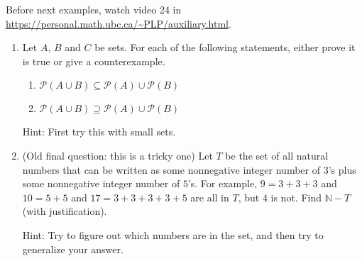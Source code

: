\documentclass[12pt]{article}
\newcommand{\set}[1]{\left\{ #1 \right\}}
\newcommand{\soln}[1]{
\iftoggle{show}{
{\color{red} \textbf{Solution:}#1
}}{}
}
\begin{document}
Before next examples, watch video 24 in \url{https://personal.math.ubc.ca/~PLP/auxiliary.html}.

\begin{enumerate}[resume]

\item
Let $A$, $B$  and $C$ be sets. For each of the following statements, either prove it is true or give a counterexample.
\begin{enumerate}
    \item $\mathcal{P}(A\cup B) \subseteq  \mathcal{P}(A)\cup \mathcal{P}(B)$
    \item $\mathcal{P}(A\cup B) \supseteq  \mathcal{P}(A)\cup \mathcal{P}(B)$
\end{enumerate}

Hint: First try this with small sets.

\item (Old final question: this is a tricky one) Let $T$ be the set of all natural numbers that can be written as some nonnegative integer
number of $3$’s plus some nonnegative integer number of $5$’s. For example, $9 = 3 + 3 + 3$ and
$10 = 5 + 5$ and $17 = 3 + 3 + 3 + 3 + 5$ are all in $T$, but $4$ is not. Find $\mathbb N-T$ (with
justification).

Hint: Try to figure out which numbers are in the set, and then try to generalize your answer.

%
%
%
%
%
%
%
%
%
%



\end{enumerate}
\end{document}
